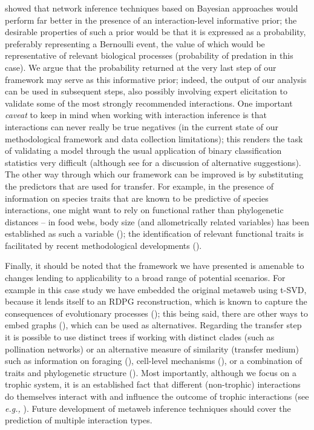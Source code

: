 \begin{refsection}
\cite{Cirtwill2019QuaFra} showed that network inference techniques based on
Bayesian approaches would perform far better in the presence of an
interaction-level informative prior; the desirable properties of such a
prior would be that it is expressed as a probability, preferably
representing a Bernoulli event, the value of which would be
representative of relevant biological processes (probability of
predation in this case). We argue that the probability returned at the
very last step of our framework may serve as this informative prior;
indeed, the output of our analysis can be used in subsequent steps, also
possibly involving expert elicitation to validate some of the most
strongly recommended interactions. One important \emph{caveat} to keep
in mind when working with interaction inference is that interactions can
never really be true negatives (in the current state of our
methodological framework and data collection limitations); this renders
the task of validating a model through the usual application of binary
classification statistics very difficult (although see
\cite{Strydom2021Roadmap} for a discussion of alternative suggestions). The
other way through which our framework can be improved is by substituting
the predictors that are used for transfer. For example, in the presence
of information on species traits that are known to be predictive of
species interactions, one might want to rely on functional rather than
phylogenetic distances -- in food webs, body size (and allometrically
related variables) has been established as such a variable
(\cite{Brose2006Consumer}); the identification of relevant functional traits
is facilitated by recent methodological developments
(\cite{Rosado2013Going}).

Finally, it should be noted that the framework we have presented is
amenable to changes lending to applicability to a broad range of
potential scenarios. For example in this case study we have embedded the
original metaweb using t-SVD, because it lends itself to an RDPG
reconstruction, which is known to capture the consequences of
evolutionary processes (\cite{DallaRiva2016Exploring}); this being said,
there are other ways to embed graphs (\cite{Arsov2019Network, Cai2017Comprehensive, Cao2019Network}), which can be used as alternatives.
Regarding the transfer step it is possible to use distinct trees if
working with distinct clades (such as pollination networks) or an
alternative measure of similarity (transfer medium) such as information
on foraging (\cite{Beckerman2006Foraging}), cell-level mechanisms
(\cite{Boeckaerts2021Predicting}), or a combination of traits and phylogenetic
structure (\cite{Stock2021Pairwise}). Most importantly, although we focus on
a trophic system, it is an established fact that different (non-trophic)
interactions do themselves interact with and influence the outcome of
trophic interactions (see \emph{e.g.,} \cite{Kawatsu2021Are, Kefi2012More}). Future development of metaweb inference techniques
should cover the prediction of multiple interaction types.


\end{refsection}
